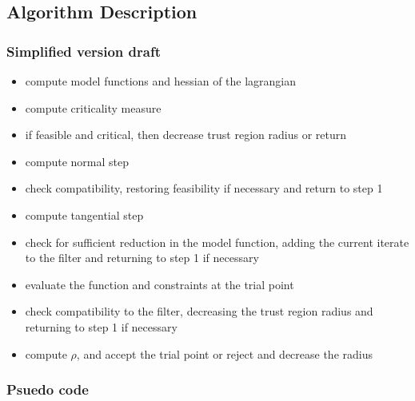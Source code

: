 \documentclass{article}
\begin{document}
\subsection{Algorithm Description}

\subsubsection{Simplified version draft}

\begin{itemize}
\item compute model functions and hessian of the lagrangian
\item compute criticality measure
\item if feasible and critical, then decrease trust region radius or return
\item compute normal step
\item check compatibility, restoring feasibility if necessary and return to step 1
\item compute tangential step
\item check for sufficient reduction in the model function, adding the current iterate to the filter and returning to step 1 if necessary
\item evaluate the function and constraints at the trial point
\item check compatibility to the filter, decreasing the trust region radius and returning to step 1 if necessary
\item compute $\rho$, and accept the trial point or reject and decrease the radius
\end{itemize}

\subsubsection{Psuedo code}
\end{document}
